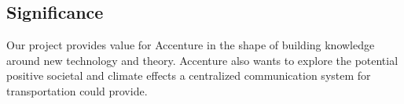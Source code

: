 \subsection{Significance}
Our project provides value for Accenture in the shape of building knowledge around new technology and theory. Accenture also wants to explore the potential positive societal and climate effects a centralized communication system for transportation could provide.

